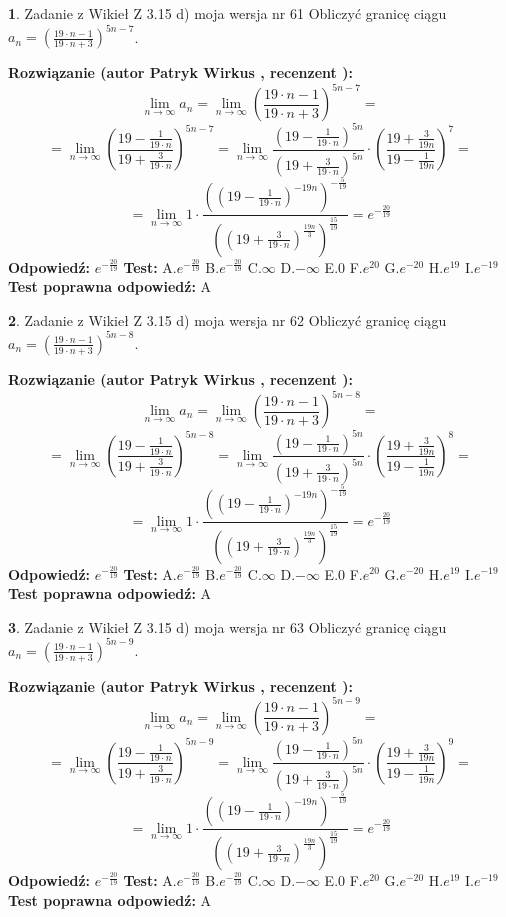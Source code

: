 \documentclass[12pt, a4paper]{article}
\theoremstyle{definition} %
\newtheorem{zad}{}
\newcommand{\zadStart}[1]{\begin{zad}#1\newline}
\newcommand{\zadStop}{\end{zad}}
\newcommand{\rozwStart}[2]{\noindent \textbf{Rozwiązanie (autor #1 , recenzent #2): }\newline}
\newcommand{\rozwStop}{\newline}
\newcommand{\odpStart}{\noindent \textbf{Odpowiedź:}\newline}
\newcommand{\odpStop}{\newline}
\newcommand{\testStart}{\noindent \textbf{Test:}\newline}
\newcommand{\testStop}{\newline}
\newcommand{\kluczStart}{\noindent \textbf{Test poprawna odpowiedź:}\newline}
\newcommand{\kluczStop}{\newline}
\begin{document}
\zadStart{Zadanie z Wikieł Z 3.15 d) moja wersja nr 61}
Obliczyć granicę ciągu $a_{n}=(\frac{19\cdot n - 1}{19 \cdot n + 3})^{5n-7}$.
\zadStop
\rozwStart{Patryk Wirkus}{}
$$\lim\limits_{n\to\infty} a_{n} = \lim\limits_{n\to\infty}(\frac{19\cdot n - 1}{19 \cdot n + 3})^{5n-7}=$$
$$=\lim\limits_{n\to\infty}(\frac{19 - \frac{1}{19\cdot n}}{19 + \frac{3}{19 \cdot n}})^{5n-7}=\lim\limits_{n\to\infty}\frac{(19 - \frac{1}{19\cdot n})^{5n}}{(19 + \frac{3}{19\cdot n})^{5n}} \cdot (\frac{19+\frac{3}{19n}}{19-\frac{1}{19n}})^{7}=$$
$$=\lim\limits_{n\to\infty} 1 \cdot \frac{((19-\frac{1}{19 \cdot n})^{-19n})^{-\frac{5}{19}}}{((19+\frac{3}{19 \cdot n})^{\frac{19n}{3}})^{\frac{15}{19}}} =e^{-\frac{20}{19}}$$
\rozwStop
\odpStart
$e^{-\frac{20}{19}}$
\odpStop
\testStart
A.$ e^{-\frac{20}{19}}$
B.$ e^{-\frac{20}{19}}$
C.$\infty$
D.$-\infty$
E.$0$
F.$e^{20}$
G.$e^{-20}$
H.$e^{19}$
I.$e^{-19}$
\testStop
\kluczStart
A
\kluczStop



\zadStart{Zadanie z Wikieł Z 3.15 d) moja wersja nr 62}
Obliczyć granicę ciągu $a_{n}=(\frac{19\cdot n - 1}{19 \cdot n + 3})^{5n-8}$.
\zadStop
\rozwStart{Patryk Wirkus}{}
$$\lim\limits_{n\to\infty} a_{n} = \lim\limits_{n\to\infty}(\frac{19\cdot n - 1}{19 \cdot n + 3})^{5n-8}=$$
$$=\lim\limits_{n\to\infty}(\frac{19 - \frac{1}{19\cdot n}}{19 + \frac{3}{19 \cdot n}})^{5n-8}=\lim\limits_{n\to\infty}\frac{(19 - \frac{1}{19\cdot n})^{5n}}{(19 + \frac{3}{19\cdot n})^{5n}} \cdot (\frac{19+\frac{3}{19n}}{19-\frac{1}{19n}})^{8}=$$
$$=\lim\limits_{n\to\infty} 1 \cdot \frac{((19-\frac{1}{19 \cdot n})^{-19n})^{-\frac{5}{19}}}{((19+\frac{3}{19 \cdot n})^{\frac{19n}{3}})^{\frac{15}{19}}} =e^{-\frac{20}{19}}$$
\rozwStop
\odpStart
$e^{-\frac{20}{19}}$
\odpStop
\testStart
A.$ e^{-\frac{20}{19}}$
B.$ e^{-\frac{20}{19}}$
C.$\infty$
D.$-\infty$
E.$0$
F.$e^{20}$
G.$e^{-20}$
H.$e^{19}$
I.$e^{-19}$
\testStop
\kluczStart
A
\kluczStop



\zadStart{Zadanie z Wikieł Z 3.15 d) moja wersja nr 63}
Obliczyć granicę ciągu $a_{n}=(\frac{19\cdot n - 1}{19 \cdot n + 3})^{5n-9}$.
\zadStop
\rozwStart{Patryk Wirkus}{}
$$\lim\limits_{n\to\infty} a_{n} = \lim\limits_{n\to\infty}(\frac{19\cdot n - 1}{19 \cdot n + 3})^{5n-9}=$$
$$=\lim\limits_{n\to\infty}(\frac{19 - \frac{1}{19\cdot n}}{19 + \frac{3}{19 \cdot n}})^{5n-9}=\lim\limits_{n\to\infty}\frac{(19 - \frac{1}{19\cdot n})^{5n}}{(19 + \frac{3}{19\cdot n})^{5n}} \cdot (\frac{19+\frac{3}{19n}}{19-\frac{1}{19n}})^{9}=$$
$$=\lim\limits_{n\to\infty} 1 \cdot \frac{((19-\frac{1}{19 \cdot n})^{-19n})^{-\frac{5}{19}}}{((19+\frac{3}{19 \cdot n})^{\frac{19n}{3}})^{\frac{15}{19}}} =e^{-\frac{20}{19}}$$
\rozwStop
\odpStart
$e^{-\frac{20}{19}}$
\odpStop
\testStart
A.$ e^{-\frac{20}{19}}$
B.$ e^{-\frac{20}{19}}$
C.$\infty$
D.$-\infty$
E.$0$
F.$e^{20}$
G.$e^{-20}$
H.$e^{19}$
I.$e^{-19}$
\testStop
\kluczStart
A
\kluczStop
\end{document}
